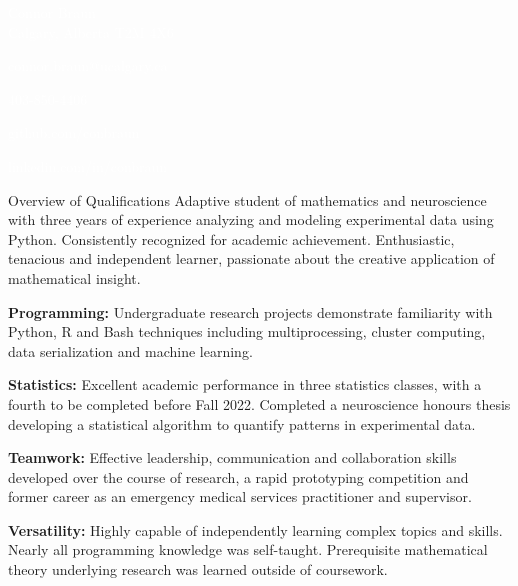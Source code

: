 \documentclass[12pt]{resume}
\newcommand*{\img}[1]{
    \raisebox{-.3\baselineskip}{
        \texttt{[image: \#1]}
    }
}
\begin{document}
\noindent
\begin{minipage}{1.5\textwidth}
    \begin{flushleft}
        \HUGE
        \textcolor{white}{Connor Braun}\\[5pt]
        \hspace{0.1cm}\large{\textcolor{white}{Calgary, Alberta T2M 4X6}}\\[5pt]
        \normalsize{
            \img{figures/email_icon.png}\textcolor{white}{connor.braun@ucalgary.ca}\vspace{12pt}
            \img{figures/phone_icon.png}\textcolor{white}{403-850-4406}\vspace{12pt}
            \img{figures/github_icon.png}\textcolor{white}{github.com/conbraun}\vspace{12pt}
            \img{figures/linkedin_icon.png}\textcolor{white}{linkedin.com/in/conbraun}
        }
    \end{flushleft}
\end{minipage}

\begin{rSection}{\Large Overview of Qualifications}
    Adaptive student of mathematics and neuroscience with three years of experience analyzing and modeling 
    experimental data using Python. Consistently recognized for academic achievement. Enthusiastic, 
    tenacious and independent learner, passionate about the creative application of mathematical
    insight. 

    {\bf Programming:} Undergraduate research projects demonstrate familiarity with Python, R and Bash
    techniques including multiprocessing, cluster computing, data serialization and machine
    learning. 

    {\bf Statistics:} Excellent academic performance in three statistics classes, with a fourth to be
    completed before Fall 2022. Completed a neuroscience honours thesis developing a statistical algorithm
    to quantify patterns in experimental data.

    {\bf Teamwork:} Effective leadership, communication and collaboration skills developed over the
    course of research, a rapid prototyping competition and former career as an emergency medical services
    practitioner and supervisor. 

    {\bf Versatility:} Highly capable of independently learning complex topics and skills. Nearly all 
    programming knowledge was self-taught. Prerequisite mathematical theory underlying research was
    learned outside of coursework.
\end{rSection}
\end{document}

